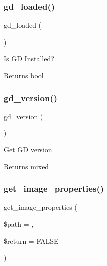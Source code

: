 \subsubsection{\texorpdfstring{gd\+\_\+loaded()}{gd\_loaded()}}
{\footnotesize\ttfamily gd\+\_\+loaded (\begin{DoxyParamCaption}{ }\end{DoxyParamCaption})}

Is GD Installed?

\begin{DoxyReturn}{Returns}
bool 
\end{DoxyReturn}
\mbox{\label{class_c_i___image__lib_a7d141f85d677d5e6db12020009569fde}} 
\subsubsection{\texorpdfstring{gd\+\_\+version()}{gd\_version()}}
{\footnotesize\ttfamily gd\+\_\+version (\begin{DoxyParamCaption}{ }\end{DoxyParamCaption})}

Get GD version

\begin{DoxyReturn}{Returns}
mixed 
\end{DoxyReturn}
\mbox{\label{class_c_i___image__lib_a91627ce4406f63c429ab13aab8f0e53c}} 
\subsubsection{\texorpdfstring{get\+\_\+image\+\_\+properties()}{get\_image\_properties()}}
{\footnotesize\ttfamily get\+\_\+image\+\_\+properties (\begin{DoxyParamCaption}\item[{}]{\$path = {\ttfamily \textquotesingle{}\textquotesingle{}},  }\item[{}]{\$return = {\ttfamily FALSE} }\end{DoxyParamCaption})}

